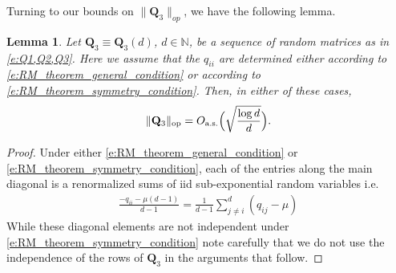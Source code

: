 \documentclass[9pt,twocolumn,twoside]{pnas-new}
\newcommand{\bbN}{{\mathbb N}}
\newcommand{\?}{\textbf{?}}
\newcommand{\op}{\textnormal{op}}
\newcommand{\as}{\textnormal{a.s.}}
\newcommand{\QQ}{\mathbf{Q}}
\newtheorem{lemma}{\bf Lemma}
\begin{document}
Turning to our bounds on $\|\QQ_3\|_{op}$, we have the following lemma.
\begin{lemma}\label{l:||Q_4||=o_P(1)} Let $\QQ_3 \equiv \QQ_3(d)$,
  $d \in \bbN$, be a sequence of random matrices as in
  \eqref{e:Q1,Q2,Q3}. Here we assume that the $q_{ii}$ are determined
  either according to \eqref{e:RM_theorem_general_condition} or
  according to \eqref{e:RM_theorem_symmetry_condition}. Then, in
  either of these cases,
    \begin{equation}\label{e:||Q_4||=o_P(1)}
      \|\QQ_3\|_{\op} = O_{\as}\Big(\sqrt{ \frac{\log d}{d}}\Big).
    \end{equation}
\end{lemma}
\begin{proof}
  Under either \eqref{e:RM_theorem_general_condition} or
  \eqref{e:RM_theorem_symmetry_condition}, each of the entries along
  the main diagonal is a renormalized sums of iid sub-exponential
  random variables i.e.
  \begin{align}
    \frac{-q_{ii} - \mu(d-1)}{d-1}
    = \frac{1}{d-1} \sum_{j \not =i}^d (q_{ij} - \mu)
  \end{align}
  While these diagonal elements are not independent under
  \eqref{e:RM_theorem_symmetry_condition} note carefully
  that we do not use the independence of the rows of $\QQ_3$
  in the arguments that follow.


\end{proof}
\end{document}
